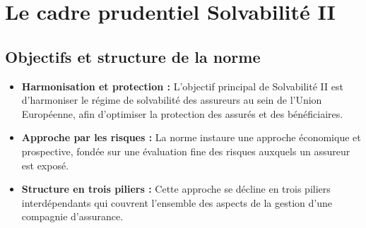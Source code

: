 \section{Le cadre prudentiel Solvabilité II}
\label{sec:s2}

\subsection{Objectifs et structure de la norme}
\begin{itemize}
    \item \textbf{Harmonisation et protection :} L'objectif principal de Solvabilité II est d'harmoniser le régime de solvabilité des assureurs au sein de l'Union Européenne, afin d'optimiser la protection des assurés et des bénéficiaires. \newline{}
    \item \textbf{Approche par les risques :} La norme instaure une approche économique et prospective, fondée sur une évaluation fine des risques auxquels un assureur est exposé. \newline{}
    \item \textbf{Structure en trois piliers :} Cette approche se décline en trois piliers interdépendants qui couvrent l'ensemble des aspects de la gestion d'une compagnie d'assurance.
\end{itemize}

